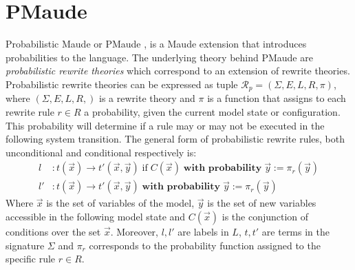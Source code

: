 \section{PMaude}
Probabilistic Maude or PMaude \cite{Agha2006}, is a Maude extension that introduces probabilities to the language. The underlying theory behind PMaude are  \textit{probabilistic rewrite theories} which correspond to an extension of rewrite theories. Probabilistic rewrite theories can be expressed as tuple $\mathscr{R}_p = (\Sigma, E, L, R, \pi)$, where $(\Sigma, E, L, R,)$ is a rewrite theory and $\pi$ is a function that assigns to each rewrite rule $r \in R$ a probability, given the current model state or configuration. This probability will determine if a rule may or may not be executed in the following system transition. The general form of probabilistic rewrite rules, both unconditional and conditional respectively is:
\begin{align*}
    l &: t(\overrightarrow{x}) \rightarrow t'(\overrightarrow{x}, \overrightarrow{y}) \; \text{if} \; C(\overrightarrow{x}) \; \textbf{with probability} \; \overrightarrow{y} := \pi_r(\overrightarrow{y}) \\
    l' &: t(\overrightarrow{x}) \rightarrow t'(\overrightarrow{x}, \overrightarrow{y}) \; \textbf{with probability} \; \overrightarrow{y} := \pi_r(\overrightarrow{y})  
\end{align*}
Where $\overrightarrow{x}$ is the set of variables of the model,  $\overrightarrow{y}$ is the set of new variables accessible in the following model state and $C(\overrightarrow{x})$ is the conjunction of conditions over the set $\overrightarrow{x}$. Moreover, $l, l'$ are labels in $L$, $t,t'$ are terms in the signature $\Sigma$ and $\pi_r$ corresponds to the probability function assigned to the specific rule $r \in R$. 


